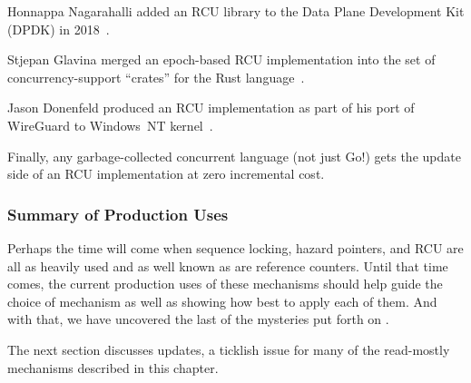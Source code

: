 Honnappa Nagarahalli added an RCU library to the Data Plane Development
Kit (DPDK) in 2018~\cite{HonnappaNagarahalli2018dpdkRCU}.

Stjepan Glavina merged an epoch-based RCU implementation into the
 set of concurrency-support ``crates'' for the Rust
language~\cite{StjepanGlavina2018RustRCU}.

Jason Donenfeld produced an RCU implementation as part of his port of
WireGuard to Windows~NT kernel~\cite{JasonDonenfeld2021:WindowsNTwireguardRCU}.

Finally, any garbage-collected concurrent language (not just Go!\@) gets
the update side of an RCU implementation at zero incremental cost.

\subsubsection{Summary of Production Uses}
\label{sec:defer:Summary of Production Uses}

Perhaps the time will come when sequence locking, hazard pointers, and
RCU are all as heavily used and as well known as are reference counters.
Until that time comes, the current production uses of these mechanisms
should help guide the choice of mechanism as well as showing how best
to apply each of them.
And with that, we have uncovered the last of the mysteries put forth on
.

The next section discusses updates, a ticklish issue for many of the
read-mostly mechanisms described in this chapter.
